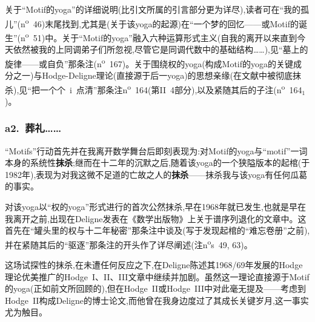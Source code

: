 关于“Motif的yoga”的详细说明(比引文所属的引言部分更为详尽),读者可在“我的孤儿”(n\textsuperscript{o}~46)末尾找到,尤其是(关于该yoga的起源)在“一个梦的回忆——或Motif的诞生”(n\textsuperscript{o}~51)中。关于“Motif的yoga”融入六种运算形式主义(自我的离开以来直到今天依然被我的上同调弟子们\dmark{}所忽视,尽管它是同调代数中的基础结构……),见“墓上的旋律——或自负”那条注(n\textsuperscript{o}~167)。关于围绕权的yoga(构成Motif的yoga的关键成分之一)与Hodge-Deligne理论(直接源于后一yoga)的思想亲缘(在文献中被彻底抹杀),见“把一个个~i~点清”那条注n\textsuperscript{o}~164(第II~4部分),以及紧随其后的子注(n\textsuperscript{o}~164$_{1}$)。

\subsubsection*{a2.~葬礼……}


“Motifs”行动首先并在我离开数学舞台后即刻表现为:对Motif的yoga与“motif”一词本身的系统性\textbf{抹杀};继而在十二年的沉默之后,随着该yoga的一个狭隘版本的起棺(于1982年),表现为对我这微不足道的亡故之人的\textbf{抹杀}——抹杀我与该yoga有任何瓜葛的事实。

对该yoga以“权的yoga”形式进行的首次公然抹杀,早在1968年就已发生,也就是早在我离开之前,出现在Deligne发表在《数学出版物》上关于谱序列退化的文章中。这首先在“罐头里的权与十二年秘密”那条注中谈及(写于发现起棺的“难忘卷册”之前),并在紧随其后的“驱逐”那条注的开头作了详尽阐述(注n\textsuperscript{o}s~49, 63)。

这场试探性的抹杀,在未遭任何反应之下,在Deligne陈述其1968/69年发展的Hodge理论优美推广的Hodge~I、II、III文章中继续并加剧。虽然这一理论直接源于Motif的yoga(正如前文所回顾的),但在Hodge~II或Hodge~III中对此毫无提及——考虑到Hodge~II构成Deligne的博士论文,而他曾在我身边度过了其成长关键岁月\dmark{},这一事实尤为触目。

